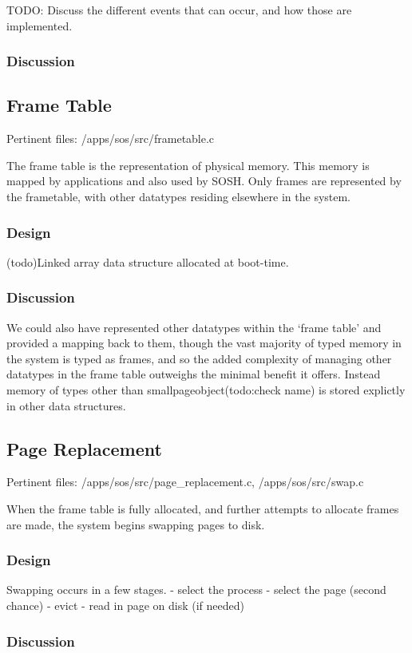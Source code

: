 \documentclass[a4paper,12pt]{article}
\begin{document}
TODO: Discuss the different events that can occur, and how those are implemented.
\subsubsection{Discussion}


\subsection{Frame Table}
Pertinent files: /apps/sos/src/frametable.c

The frame table is the representation of physical memory. This memory is
mapped by applications and also used by SOSH.  Only frames are represented by
the frametable, with other datatypes residing elsewhere in the system.
\subsubsection{Design}
(todo)Linked array data structure allocated at boot-time.

\subsubsection{Discussion}
We could also have represented other datatypes within the `frame table' and
provided a mapping back to them, though the vast majority of typed memory in
the system is typed as frames, and so the added complexity of managing other
datatypes in the frame table outweighs the minimal benefit it offers.  Instead
memory of types other than smallpageobject(todo:check name) is stored
explictly in other data structures.

\subsection{Page Replacement}
Pertinent files: /apps/sos/src/page\_replacement.c, /apps/sos/src/swap.c

When the frame table is fully allocated, and further attempts to allocate
frames are made, the system begins swapping pages to disk.

\subsubsection{Design}
Swapping occurs in a few stages.
- select the process
- select the page (second chance)
- evict
- read in page on disk (if needed)

\subsubsection{Discussion}
\end{document}
